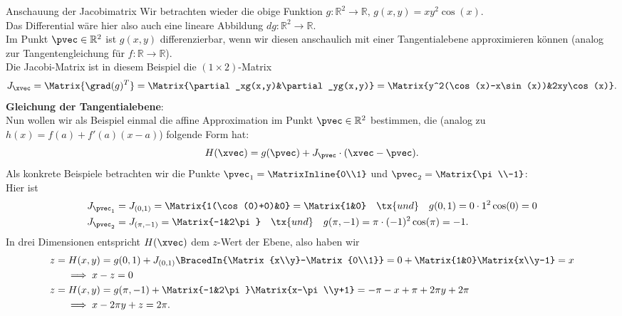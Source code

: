 \begin{Beispiel}
{Anschauung der Jacobimatrix}
Wir betrachten wieder die obige Funktion $g:\mathbb{R}^2\to\mathbb{R},\,g(x,y)=xy^2\cos(x)$.\\
Das Differential wäre hier also auch eine lineare Abbildung $dg:\mathbb{R}^2\to\mathbb{R}$.\\
Im Punkt $\pvec\in\mathbb{R}^2$ ist $g(x,y)$ differenzierbar, wenn wir diesen anschaulich mit einer Tangentialebene approximieren können (analog zur Tangentengleichung für $f:\mathbb{R}\to\mathbb{R}$).\\
Die Jacobi-Matrix ist in diesem Beispiel die $(1\times2)$-Matrix
\begin{equation*}
    J_\xvec=\Matrix{\grad(g)^T}=\Matrix{\partial_xg(x,y)&\partial_yg(x,y)}=\Matrix{y^2(\cos(x)-x\sin(x))&2xy\cos(x)}.
\end{equation*}
\textbf{Gleichung der Tangentialebene}:\\
Nun wollen wir als Beispiel einmal die affine Approximation im Punkt $\pvec\in\mathbb{R}^2$ bestimmen, die (analog zu $h(x)=f(a)+f'(a)(x-a)$) folgende Form hat:
\begin{equation*}
    H(\xvec)=g(\pvec)+J_\pvec\cdot(\xvec-\pvec).
\end{equation*}
Als konkrete Beispiele betrachten wir die Punkte $\pvec_1=\MatrixInline{0\\1}$ und $\pvec_2=\Matrix{\pi\\-1}$:\\
Hier ist
\begin{align*}
    J_{\pvec_1}&=J_{(0,1)}=\Matrix{1(\cos(0)+0)&0}=\Matrix{1&0}\quad\tx{und}\quad g(0,1)=0\cdot1^2\cos(0)=0\\
    J_{\pvec_2}&=J_{(\pi,-1)}=\Matrix{-1&2\pi}\quad\tx{und}\quad g(\pi,-1)=\pi\cdot(-1)^2\cos(\pi)=-1.
\end{align*}
In drei Dimensionen entspricht $H(\xvec)$ dem $z$-Wert der Ebene, also haben wir
\begin{align*}
    z&=H(x,y)=g(0,1)+J_{(0,1)}\BracedIn{\Matrix{x\\y}-\Matrix{0\\1}}=0+\Matrix{1&0}\Matrix{x\\y-1}=x\\
    &\quad\implies x-z=0\\
    z&=H(x,y)=g(\pi,-1)+\Matrix{-1&2\pi}\Matrix{x-\pi\\y+1}=-\pi-x+\pi+2\pi y+2\pi\\
    &\quad\implies x-2\pi y+z=2\pi.
\end{align*}

\end{Beispiel}

